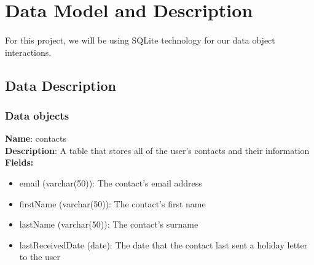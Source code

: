 \documentclass{article}
\begin{document}

\section{Data Model and Description}
\paragraph{}
For this project, we will be using SQLite technology for our data object interactions.

\subsection{Data Description}

\subsubsection{Data objects}
\textbf{Name}: contacts \\
\textbf{Description}: A table that stores all of the user's contacts and their information \\
\textbf{Fields:}
\begin{itemize}
\item email (varchar(50)): The contact's email address
\item firstName (varchar(50)): The contact's first name
\item lastName (varchar(50)): The contact's surname
\item lastReceivedDate (date): The date that the contact last sent a holiday letter to the user
\end{itemize}

\end{document}
